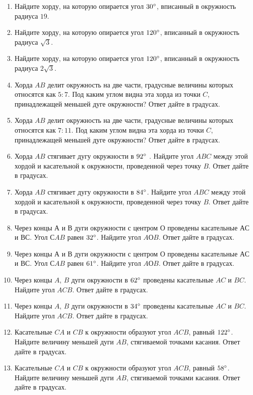 \documentclass[12pt, a4paper]{article}
\begin{document}
\begin{enumerate}
		\item Найдите хорду, на которую опирается угол \( 30\degree\), вписанный в окружность радиуса \( 19 \).
		\item Найдите хорду, на которую опирается угол \( 120 \degree\), вписанный в окружность радиуса \( \sqrt{3} \).
		\item Найдите хорду, на которую опирается угол \( 120\degree \), вписанный в окружность радиуса \( 2\sqrt{3} \).
		\item Хорда \( AB \)  делит окружность на две части, градусные величины которых относятся как \( 5:7 \). Под каким углом видна эта хорда из точки \( C \), принадлежащей меньшей дуге окружности? Ответ дайте в градусах.
		\item Хорда \( AB \)  делит окружность на две части, градусные величины которых относятся как \( 7:11 \). Под каким углом видна эта хорда из точки \( C \), принадлежащей меньшей дуге окружности? Ответ дайте в градусах.
		\item Хорда \( AB \)  стягивает дугу окружности в \( 92\degree\) . Найдите угол \( ABC \)  между этой хордой и касательной к окружности, проведенной через точку \( B \). Ответ дайте в градусах.
		\item Хорда \( AB \)  стягивает дугу окружности в \( 84 \degree\). Найдите угол \( ABC \)  между этой хордой и касательной к окружности, проведенной через точку \( B \). Ответ дайте в градусах.
		\item Через концы \( А \) и \( В \) дуги окружности с центром \( О  \) проведены касательные \( АС \)  и \( ВС \). Угол \( СAB \)  равен \( 32\degree\). Найдите угол \( AОB \). Ответ дайте в градусах.
		\item Через концы \( А \)  и \( В \)  дуги окружности с центром \( О \)  проведены касательные \( АС \)  и \( ВС \). Угол \( СAB \)  равен \(  61\degree \). Найдите угол \( AОB \). Ответ дайте в градусах.
		\item Через концы \( A \), \( B \)  дуги окружности в \( 62\degree \) проведены касательные \( AC \)  и \( BC \). Найдите угол \( ACB \). Ответ дайте в градусах.
		\item Через концы \( A \), \( B \)  дуги окружности в \( 34\degree \) проведены касательные \( AC \)  и \( BC \). Найдите угол \( ACB \). Ответ дайте в градусах.
		\item Касательные \( CA \)  и \( CB \) к окружности образуют угол \( ACB \), равный \( 122\degree\). Найдите величину меньшей дуги \( AB \), стягиваемой точками касания. Ответ дайте в градусах.
		\item Касательные \( CA \)  и \( CB \)  к окружности образуют угол \( ACB \), равный \( 58 \degree\). Найдите величину меньшей дуги \( AB \), стягиваемой точками касания. Ответ дайте в градусах.

\end{enumerate}
\end{document}
